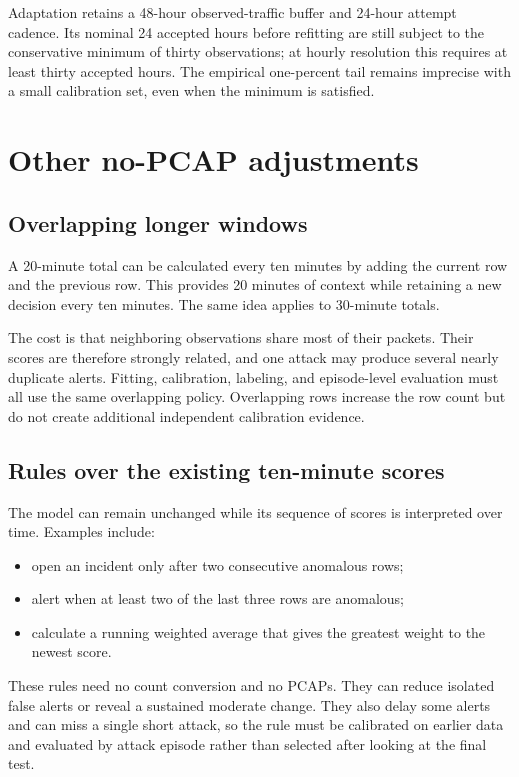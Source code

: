 \documentclass[11pt,a4paper]{article}
\begin{document}
Adaptation retains a 48-hour observed-traffic buffer and 24-hour attempt
cadence. Its nominal 24 accepted hours before refitting are still subject to
the conservative minimum of thirty observations; at hourly resolution this
requires at least thirty accepted hours. The empirical one-percent tail remains
imprecise with a small calibration set, even when the minimum is satisfied.

\section{Other no-PCAP adjustments}

\subsection{Overlapping longer windows}

A 20-minute total can be calculated every ten minutes by adding the current row
and the previous row.  This provides 20 minutes of context while retaining a
new decision every ten minutes.  The same idea applies to 30-minute totals.

The cost is that neighboring observations share most of their packets.  Their
scores are therefore strongly related, and one attack may produce several
nearly duplicate alerts.  Fitting, calibration, labeling, and episode-level
evaluation must all use the same overlapping policy.  Overlapping rows increase
the row count but do not create additional independent calibration evidence.

\subsection{Rules over the existing ten-minute scores}

The model can remain unchanged while its sequence of scores is interpreted over
time.  Examples include:

\begin{itemize}
  \item open an incident only after two consecutive anomalous rows;
  \item alert when at least two of the last three rows are anomalous;
  \item calculate a running weighted average that gives the greatest weight to
        the newest score.
\end{itemize}

These rules need no count conversion and no PCAPs.  They can reduce isolated
false alerts or reveal a sustained moderate change.  They also delay some
alerts and can miss a single short attack, so the rule must be calibrated on
earlier data and evaluated by attack episode rather than selected after looking
at the final test.
\end{document}
